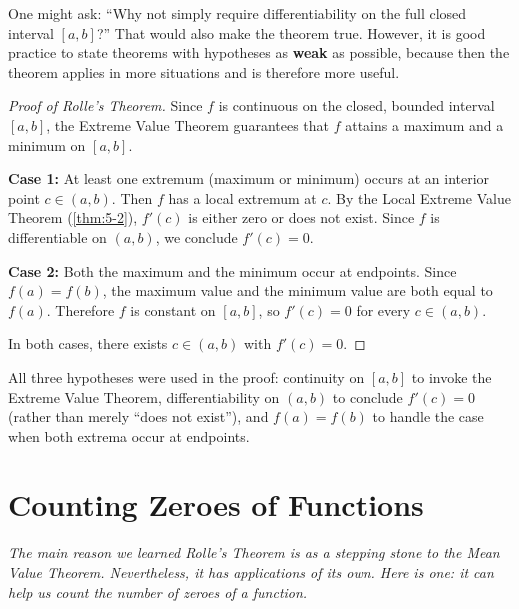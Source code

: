 \begin{remark}
One might ask: ``Why not simply require differentiability on the full closed interval $[a,b]$?'' That would also make the theorem true.  However, it is good practice to state theorems with hypotheses as \textbf{weak} as possible, because then the theorem applies in more situations and is therefore more useful.
\end{remark}

\begin{proof}[Proof of Rolle's Theorem]
Since $f$ is continuous on the closed, bounded interval $[a,b]$, the Extreme Value Theorem guarantees that $f$ attains a maximum and a minimum on $[a,b]$.


\textbf{Case 1:} At least one extremum (maximum or minimum) occurs at an interior point $c \in (a,b)$.  Then $f$ has a local extremum at $c$.  By the Local Extreme Value Theorem (\cref{thm:5-2}), $f'(c)$ is either zero or does not exist.  Since $f$ is differentiable on $(a,b)$, we conclude $f'(c) = 0$.

\textbf{Case 2:} Both the maximum and the minimum occur at endpoints.  Since $f(a) = f(b)$, the maximum value and the minimum value are both equal to $f(a)$.  Therefore $f$ is constant on $[a,b]$, so $f'(c) = 0$ for every $c \in (a,b)$.

In both cases, there exists $c \in (a,b)$ with $f'(c) = 0$.
\end{proof}

\begin{remark}
All three hypotheses were used in the proof: continuity on $[a,b]$ to invoke the Extreme Value Theorem, differentiability on $(a,b)$ to conclude $f'(c) = 0$ (rather than merely ``does not exist''), and $f(a) = f(b)$ to handle the case when both extrema occur at endpoints.
\end{remark}

\section{Counting Zeroes of Functions}
\label{sec:5.6}

\textit{The main reason we learned Rolle's Theorem is as a stepping stone to the Mean Value Theorem.  Nevertheless, it has applications of its own.  Here is one: it can help us count the number of zeroes of a function.}

